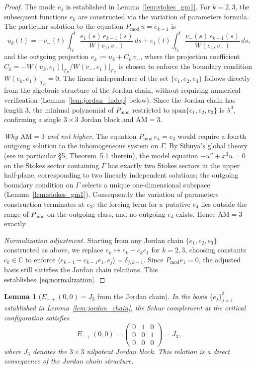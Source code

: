 \documentclass[12pt,a4paper]{amsart}
\newtheorem{lemma}[theorem]{Lemma}
\theoremstyle{remark}
\begin{document}
\begin{proof}
The mode $e_1$ is established in Lemma~\ref{lem:stokes_gm1}.
For $k = 2, 3$, the subsequent functions $e_k$ are constructed via the variation of parameters formula.
The particular solution to the equation $P_{\mathrm{mod}}\,u = e_{k-1}$ is
\[
  u_k(t) = -v_-(t)\int_{t_L}^t \frac{e_1(s)\,e_{k-1}(s)}{W(e_1,v_-)}\,ds
            + e_1(t)\int_{t_L}^t \frac{v_-(s)\,e_{k-1}(s)}{W(e_1,v_-)}\,ds,
\]
and the outgoing projection $e_k := u_k + C_k\,v_-$, where the projection coefficient
$C_k = -W(u_k,e_1)\big|_{T_R}/W(v_-,e_1)\big|_{T_R}$ is chosen to enforce the boundary condition
$W(e_k, e_1)\big|_{T_R} = 0$.
The linear independence of the set $\{e_1,e_2,e_3\}$ follows directly from the algebraic structure
of the Jordan chain, without requiring numerical verification
(Lemma~\ref{lem:jordan_indep} below).
Since the Jordan chain has length 3, the minimal polynomial of $P_{\mathrm{mod}}$
restricted to $\mathrm{span}\{e_1,e_2,e_3\}$ is $\lambda^3$, confirming a single
$3\times 3$ Jordan block and $\mathrm{AM} = 3$.

\emph{Why $\mathrm{AM} = 3$ and not higher.}
The equation $P_{\mathrm{mod}}\,e_4 = e_3$ would require a fourth outgoing solution
to the inhomogeneous system on $\Gamma$.
By Sibuya's global theory~\cite{Sibuya75} (see in particular \S5, Theorem~5.1 therein),
the model equation $-u'' + x^3 u = 0$ on the Stokes sector containing $\Gamma$
has exactly two Stokes sectors in the upper half-plane, corresponding to two
linearly independent solutions; the outgoing boundary condition on $\Gamma$ selects
a unique one-dimensional subspace (Lemma~\ref{lem:stokes_gm1}).
Consequently the variation of parameters construction terminates at $e_3$:
the forcing term for a putative $e_4$ lies outside the range of $P_{\mathrm{mod}}$
on the outgoing class, and no outgoing $e_4$ exists.
Hence $\mathrm{AM} = 3$ exactly.

\emph{Normalization adjustment.}
Starting from any Jordan chain $\{e_1, e_2, e_3\}$ constructed as above, we replace
$e_k \mapsto e_k - c_k e_1$ for $k = 2, 3$, choosing constants $c_k \in \mathbb{C}$
to enforce $\langle e_{k-1} - c_{k-1}e_1, e_j\rangle = \delta_{j,k-1}$.
Since $P_{\mathrm{mod}} e_1 = 0$, the adjusted basis still satisfies the Jordan chain
relations.  This establishes~\eqref{eq:normalization}.
\end{proof}

\begin{lemma}[$E_{-+}(0,0) = J_3$ from the Jordan chain]
\label{lem:Eminus_J3}
In the basis $\{e_j\}_{j=1}^3$ established in Lemma~\ref{lem:jordan_chain}, the Schur complement
at the critical configuration satisfies
\[
  E_{-+}(0,0) =
  \begin{pmatrix} 0 & 1 & 0 \\ 0 & 0 & 1 \\ 0 & 0 & 0 \end{pmatrix}
  = J_3,
\]
where $J_3$ denotes the $3\times 3$ nilpotent Jordan block.
This relation is a direct consequence of the Jordan chain structure.
\end{lemma}
\end{document}
